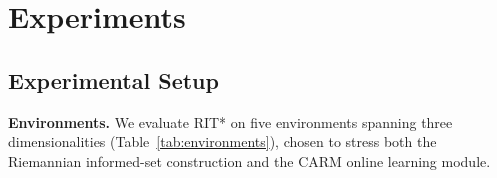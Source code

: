 \documentclass[journal]{IEEEtran}
\begin{document}
\section{Experiments}\label{sec:experiments}

\subsection{Experimental Setup}\label{sec:setup}

\textbf{Environments.}
We evaluate RIT* on five environments spanning three dimensionalities
(Table~\ref{tab:environments}), chosen to stress both the
Riemannian informed-set construction and the CARM online learning
module.
\end{document}
